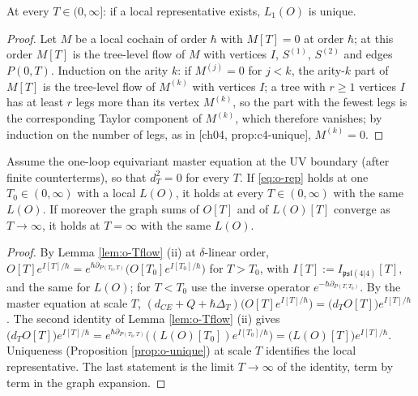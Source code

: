 \begin{proposition}[Uniqueness]
\label{prop:o-unique}
At every $T\in(0,\infty]$: if a local representative exists, $L_1(O)$ is unique.
\end{proposition}

\begin{proof}
Let $M$ be a local cochain of order $\hbar$ with $M[T]=0$ at order $\hbar$; at this order $M[T]$ is the tree-level flow of $M$ with vertices $I$, $S^{(1)}$, $S^{(2)}$ and edges $P(0,T)$. Induction on the arity $k$: if $M^{(j)}=0$ for $j<k$, the arity-$k$ part of $M[T]$ is the tree-level flow of $M^{(k)}$ with vertices $I$; a tree with $r\ge1$ vertices $I$ has at least $r$ legs more than its vertex $M^{(k)}$, so the part with the fewest legs is the corresponding Taylor component of $M^{(k)}$, which therefore vanishes; by induction on the number of legs, as in [ch04, prop:c4-unique], $M^{(k)}=0$.
\end{proof}

\begin{proposition}
\label{prop:o-Tindep}
Assume the one-loop equivariant master equation at the UV boundary (after finite counterterms), so that $d_T^2=0$ for every $T$. If \eqref{eq:o-rep} holds at one $T_0\in(0,\infty)$ with a local $L(O)$, it holds at every $T\in(0,\infty)$ with the same $L(O)$. If moreover the graph sums of $O[T]$ and of $L(O)[T]$ converge as $T\to\infty$, it holds at $T=\infty$ with the same $L(O)$.
\end{proposition}

\begin{proof}
By Lemma \ref{lem:o-Tflow} (ii) at $\delta$-linear order, $O[T]e^{I[T]/\hbar}=e^{\hbar\partial_{P(T_0,T)}}\big(O[T_0]e^{I[T_0]/\hbar}\big)$ for $T>T_0$, with $I[T]:=I_{\mathfrak{psl}(4|4)}[T]$, and the same for $L(O)$; for $T<T_0$ use the inverse operator $e^{-\hbar\partial_{P(T,T_0)}}$. By the master equation at scale $T$, $(d_{CE}+Q+\hbar\Delta_T)\big(O[T]e^{I[T]/\hbar}\big)=\big(d_TO[T]\big)e^{I[T]/\hbar}$. The second identity of Lemma \ref{lem:o-Tflow} (ii) gives $\big(d_TO[T]\big)e^{I[T]/\hbar}=e^{\hbar\partial_{P(T_0,T)}}\big((L(O)[T_0])e^{I[T_0]/\hbar}\big)=\big(L(O)[T]\big)e^{I[T]/\hbar}$. Uniqueness (Proposition \ref{prop:o-unique}) at scale $T$ identifies the local representative. The last statement is the limit $T\to\infty$ of the identity, term by term in the graph expansion.
\end{proof}

